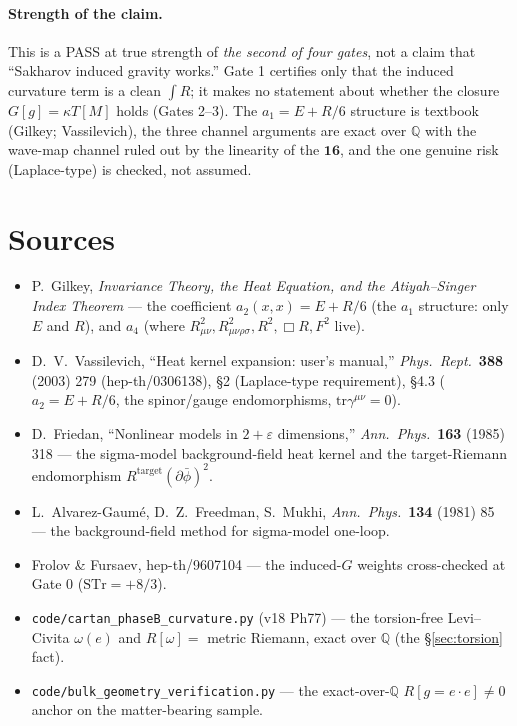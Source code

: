 \documentclass[11pt]{article}
\newcommand{\STr}{\mathrm{STr}}
\newcommand{\QQ}{\mathbb{Q}}
\newcommand{\tr}{\mathrm{tr}}
\newcommand{\Rt}{R^{\mathrm{target}}}
\begin{document}
\paragraph{Strength of the claim.} This is a PASS at true strength of \emph{the second of four
gates}, not a claim that ``Sakharov induced gravity works.'' Gate 1 certifies only that the
induced curvature term is a clean $\int R$; it makes no statement about whether the closure
$G[g]=\kappa T[M]$ holds (Gates 2--3). The $a_1=E+R/6$ structure is textbook (Gilkey;
Vassilevich), the three channel arguments are exact over $\QQ$ with the wave-map channel
ruled out by the linearity of the $\mathbf{16}$, and the one genuine risk (Laplace-type) is
checked, not assumed.

\section*{Sources}
\begin{itemize}
\item P.\ Gilkey, \textit{Invariance Theory, the Heat Equation, and the Atiyah--Singer
Index Theorem} --- the coefficient $a_2(x,x)=E+R/6$ (the $a_1$ structure: only $E$ and $R$),
and $a_4$ (where $R_{\mu\nu}^2,R_{\mu\nu\rho\sigma}^2,R^2,\Box R,F^2$ live).
\item D.\ V.\ Vassilevich, ``Heat kernel expansion: user's manual,'' \textit{Phys.\ Rept.}\
\textbf{388} (2003) 279 (hep-th/0306138), \S2 (Laplace-type requirement), \S4.3
($a_2=E+R/6$, the spinor/gauge endomorphisms, $\tr\gamma^{\mu\nu}=0$).
\item D.\ Friedan, ``Nonlinear models in $2+\varepsilon$ dimensions,'' \textit{Ann.\ Phys.}\
\textbf{163} (1985) 318 --- the sigma-model background-field heat kernel and the
target-Riemann endomorphism $\Rt(\partial\bar\phi)^2$.
\item L.\ Alvarez-Gaum\'e, D.\ Z.\ Freedman, S.\ Mukhi, \textit{Ann.\ Phys.}\ \textbf{134}
(1981) 85 --- the background-field method for sigma-model one-loop.
\item Frolov \& Fursaev, hep-th/9607104 --- the induced-$G$ weights cross-checked at Gate 0
($\STr=+8/3$).
\item \texttt{code/cartan\_phaseB\_curvature.py} (v18 Ph77) --- the torsion-free Levi--Civita
$\omega(e)$ and $R[\omega]=$ metric Riemann, exact over $\QQ$ (the \S\ref{sec:torsion} fact).
\item \texttt{code/bulk\_geometry\_verification.py} --- the exact-over-$\QQ$ $R[g=e\cdot e]\neq0$
anchor on the matter-bearing sample.
\end{itemize}
\end{document}
